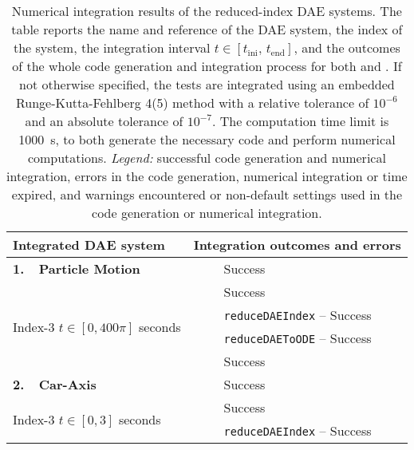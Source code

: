 \setlength\tabcolsep{2.5pt}
\setlength{\LTcapwidth}{\textwidth}
{\footnotesize\centering\begin{longtable}{lccl}
  \caption{Numerical integration results of the reduced-index \ac{DAE} systems. The table reports the name and reference of the \ac{DAE} system, the index of the system, the integration interval $t \in [t_{\text{ini}}, \, t_{\text{end}}]$, and the outcomes of the whole code generation and integration process for both \Maple{} and \Indigo{}. If not otherwise specified, the tests are integrated using an embedded Runge-Kutta-Fehlberg 4(5) method with a relative tolerance of $10^{-6}$ and an absolute tolerance of $10^{-7}$. The computation time limit is \SI{1000}{\second}, to both generate the necessary code and perform numerical computations. \emph{Legend:} \mycheckmark{} successful code generation and numerical integration, \mycrossmark{} errors in the code generation, numerical integration or time expired, and \mywarnmark{} warnings encountered or non-default settings used in the code generation or numerical integration.}
  \label{chap5:tab:numerical_integration}
  \endfirsthead
  \endhead
  \toprule
  \textbf{Integrated \ac{DAE} system} &
  \multicolumn{3}{l}{\textbf{Integration outcomes and errors}} \\
  \midrule
  \multirow{1}{*}{\textbf{1.~~Particle Motion~\cite{campbell1995constraint}}}
    & \Maple{}       & \mycheckmark{}\phantom{\mywarnmark{}} & Success \\ \cmidrule{2-4}
    \multirow{4}{*}{Index-3 \quad $t \in [0, 400\pi]$ seconds} & \Mathematica{} & \mycheckmark{}\phantom{\mywarnmark{}} & Success \\ \cmidrule{2-4}
    & \multirow{2}{*}{\Matlab{}} & \mycheckmark{}\phantom{\mywarnmark{}} & \texttt{reduceDAEIndex} -- Success \\ \cmidrule{3-4}
    &                            & \mycheckmark{}\phantom{\mywarnmark{}} & \texttt{reduceDAEToODE} -- Success \\ \cmidrule{2-4}\cmidrule{2-4}
    & \Indigo{} & \mycheckmark{}\phantom{\mywarnmark{}} & Success \\ \midrule
  \multirow{1}{*}{\textbf{2.~~Car-Axis~\cite{lioen1998test, mazzia2008test}}}
    & \Maple{}       & \mycheckmark{}\phantom{\mywarnmark{}} & Success \\ \cmidrule{2-4}
    \multirow{4}{*}{Index-3 \quad $t \in [0, 3]$ seconds} & \Mathematica{} & \mycheckmark{}\phantom{\mywarnmark{}} & Success \\ \cmidrule{2-4}
    & \multirow{2}{*}{\Matlab{}} & \mycheckmark{}\phantom{\mywarnmark{}} & \texttt{reduceDAEIndex} -- Success \\ \cmidrule{3-4}

\end{longtable}}
